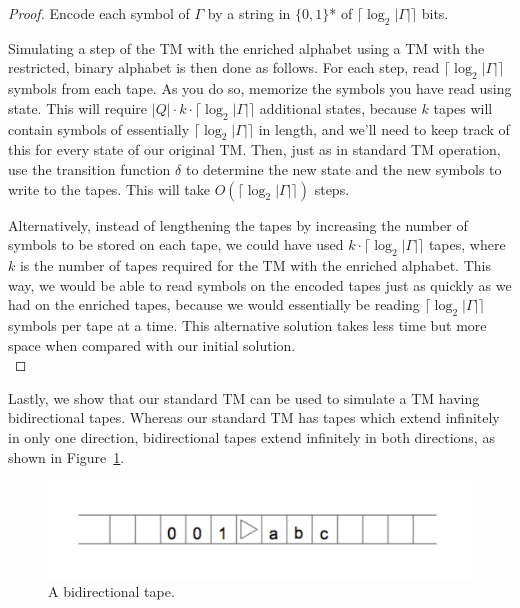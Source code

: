 \documentclass[usletter]{article}
\begin{document}
\begin{proof}
Encode each symbol of $\Gamma$ by a string in $\{0,1\}$* of $\lceil\log_2|\Gamma|\rceil$ bits.

Simulating a step of the TM with the enriched alphabet using a TM with the restricted, binary alphabet is then done as follows. For each step, read $\lceil\log_2|\Gamma|\rceil$ symbols from each tape. As you do so, memorize the symbols you have read using state. This will require $|Q|\cdot k\cdot\lceil\log_2|\Gamma|\rceil$ additional states, because $k$ tapes will contain symbols of essentially $\lceil\log_2|\Gamma|\rceil$ in length, and we'll need to keep track of this for every state of our original TM. Then, just as in standard TM operation, use the transition function $\delta$ to determine the new state and the new symbols to write to the tapes. This will take $O(\lceil\log_2|\Gamma|\rceil)$ steps.


Alternatively, instead of lengthening the tapes by increasing the number of symbols to be stored on each tape, we could have used $k\cdot\lceil\log_2|\Gamma|\rceil$ tapes, where $k$ is the number of tapes required for the TM with the enriched alphabet. This way, we would be able to read symbols on the encoded tapes just as quickly as we had on the enriched tapes, because we would essentially be reading $\lceil\log_2|\Gamma|\rceil$ symbols per tape at a time. This alternative solution takes less time but more space when compared with our initial solution.\\

\end{proof}

Lastly, we show that our standard TM can be used to simulate a TM having bidirectional tapes. Whereas our standard TM has tapes which extend infinitely in only one direction, bidirectional tapes extend infinitely in both directions, as shown in Figure~\ref{fig:bidirectional}.

\begin{figure}[h!]
\begin{center}
\includegraphics[width=.6\textwidth]{bidirectional}
\end{center}
\caption{A bidirectional tape.}
\label{fig:bidirectional}
\end{figure}
\end{document}
